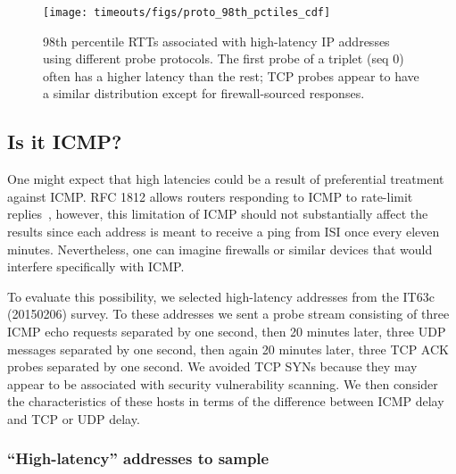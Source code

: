 
\begin{figure}[tb]
\begin{center}
\texttt{[image: timeouts/figs/proto\_98th\_pctiles\_cdf]}
\end{center}
\caption[High RTTs are observed across ICMP, UDP, and TCP]{\label{fig:icmp_vs_udp_vs_tcp}%
98th percentile RTTs associated with high-latency IP addresses using different probe protocols.  The first probe of a triplet (seq 0) often has a higher latency than the rest; TCP probes appear to have a similar distribution except for firewall-sourced responses.}
\end{figure}

\subsection{Is it ICMP?}

One might expect that high latencies could be a result of
preferential treatment against ICMP.
RFC 1812 allows routers responding to ICMP to rate-limit
replies~\cite{rfc1812,ipmp}, however, this limitation of ICMP
should not substantially affect the results since each
address is meant to receive a ping from ISI once every
eleven minutes. Nevertheless, one can imagine firewalls or
similar devices that would interfere specifically with ICMP.

To evaluate this possibility, we selected high-latency
addresses from the IT63c (20150206) survey.  To these
addresses we sent a probe stream consisting of three ICMP
echo requests separated by one second, then 20 minutes
later, three UDP messages separated by one second, then
again 20 minutes later, three TCP ACK probes separated by one
second.
We avoided TCP SYNs
because they may appear to be associated with security 
vulnerability scanning.
We then consider the characteristics of these hosts
in terms of the difference between ICMP delay and TCP or UDP
delay.

\subsubsection*{``High-latency'' addresses to sample}

